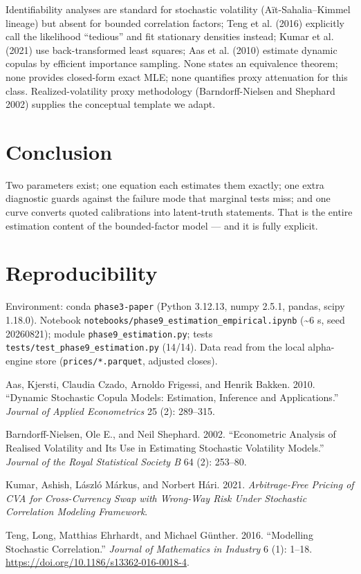 \documentclass[
  english,
  10pt,
  letterpaper,
  DIV=11,
  numbers=noendperiod]{scrartcl}
\newcounter{none} %
\newlength{\cslhangindent}
\newenvironment{CSLReferences}[2] %
 {\begin{list}{}{%
  \setlength{\itemindent}{0pt}
  \setlength{\leftmargin}{0pt}
  \setlength{\parsep}{0pt}
  \ifodd #1
   \setlength{\leftmargin}{\cslhangindent}
   \setlength{\itemindent}{-1\cslhangindent}
  \fi
  \setlength{\itemsep}{#2\baselineskip}}}
 {\end{list}}
\begin{document}
Identifiability analyses are standard for stochastic volatility
(Aït-Sahalia--Kimmel lineage) but absent for bounded correlation
factors; Teng et al. (2016) explicitly call the likelihood ``tedious''
and fit stationary densities instead; Kumar et al. (2021) use
back-transformed least squares; Aas et al. (2010) estimate dynamic
copulas by efficient importance sampling. None states an equivalence
theorem; none provides closed-form exact MLE; none quantifies proxy
attenuation for this class. Realized-volatility proxy methodology
(Barndorff-Nielsen and Shephard 2002) supplies the conceptual template
we adapt.

\section{Conclusion}\label{sec-conclusion}

Two parameters exist; one equation each estimates them exactly; one
extra diagnostic guards against the failure mode that marginal tests
miss; and one curve converts quoted calibrations into latent-truth
statements. That is the entire estimation content of the bounded-factor
model --- and it is fully explicit.

\section{Reproducibility}\label{sec-repro}

Environment: conda \texttt{phase3-paper} (Python 3.12.13, numpy 2.5.1,
pandas, scipy 1.18.0). Notebook
\texttt{notebooks/phase9\_estimation\_empirical.ipynb} (\textasciitilde6
s, seed 20260821); module \texttt{phase9\_estimation.py}; tests
\texttt{tests/test\_phase9\_estimation.py} (14/14). Data read from the
local alpha-engine store (\texttt{prices/*.parquet}, adjusted closes).

\protect{}\label{refs}
\begin{CSLReferences}{1}{1}
Aas, Kjersti, Claudia Czado, Arnoldo Frigessi, and Henrik Bakken. 2010.
{``Dynamic Stochastic Copula Models: Estimation, Inference and
Applications.''} \emph{Journal of Applied Econometrics} 25 (2):
289--315.

Barndorff-Nielsen, Ole E., and Neil Shephard. 2002. {``Econometric
Analysis of Realised Volatility and Its Use in Estimating Stochastic
Volatility Models.''} \emph{Journal of the Royal Statistical Society B}
64 (2): 253--80.

Kumar, Ashish, László Márkus, and Norbert Hári. 2021.
\emph{Arbitrage-Free Pricing of {CVA} for Cross-Currency Swap with
Wrong-Way Risk Under Stochastic Correlation Modeling Framework}.

Teng, Long, Matthias Ehrhardt, and Michael Günther. 2016. {``Modelling
Stochastic Correlation.''} \emph{Journal of Mathematics in Industry} 6
(1): 1--18. \url{https://doi.org/10.1186/s13362-016-0018-4}.

\end{CSLReferences}
\end{document}
